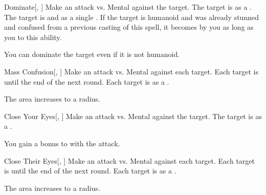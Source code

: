 \lowercase{\hypertarget{spell:Dominate}{}}\label{spell:Dominate}
\begin{freeability}[Rank 5]{\hypertarget{spell:Dominate}{Dominate}}[, ]
Make an attack vs. Mental against the target.
\hit The target is  as a .
\crit The target is  and  as a single .
If the target is humanoid and was already stunned and confused from a previous casting of this spell, it becomes  by you as long as you  to this ability.

\rankline
{} You can dominate the target even if it is not humanoid.
\end{freeability}
\vspace{0.25em}



\lowercase{\hypertarget{spell:Mass Confusion}{}}\label{spell:Mass Confusion}
\begin{freeability}[Rank 5]{\hypertarget{spell:Mass Confusion}{Mass Confusion}}[, ]
Make an attack vs. Mental against each target.
\hit Each target is \confused until the end of the next round.
\crit Each target is  as a .

\rankline
{} The area increases to a \areamed radius.
\end{freeability}
\vspace{0.25em}



\lowercase{\hypertarget{spell:Close Your Eyes}{}}\label{spell:Close Your Eyes}
\begin{freeability}[Rank 6]{\hypertarget{spell:Close Your Eyes}{Close Your Eyes}}[, ]
Make an attack vs. Mental against the target.
\hit The target is  as a .

\rankline
{} You gain a  bonus to  with the attack.
\end{freeability}
\vspace{0.25em}



\lowercase{\hypertarget{spell:Close Their Eyes}{}}\label{spell:Close Their Eyes}
\begin{freeability}[Rank 7]{\hypertarget{spell:Close Their Eyes}{Close Their Eyes}}[, ]
Make an attack vs. Mental against each target.
\hit Each target is \blinded until the end of the next round.
\crit Each target is  as a .

\rankline
{} The area increases to a \areamed radius.
\end{freeability}
\vspace{0.25em}



